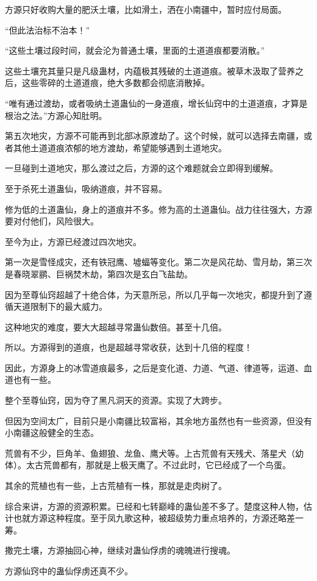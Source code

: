 \begin{this_body}
方源只好收购大量的肥沃土壤，比如滑土，洒在小南疆中，暂时应付局面。

“但此法治标不治本！”

“这些土壤过段时间，就会沦为普通土壤，里面的土道道痕都要消散。”

这些土壤充其量只是凡级蛊材，内蕴极其残破的土道道痕。被草木汲取了营养之后，这些零碎的土道道痕，绝大多数都会彻底消散掉。

“唯有通过渡劫，或者吸纳土道蛊仙的一身道痕，增长仙窍中的土道道痕，才算是根治之法。”方源心知肚明。

第五次地灾，方源不可能再到北部冰原渡劫了。这个时候，就可以选择去南疆，或者其他土道道痕浓郁的地方渡劫，希望能够遇到土道地灾。

一旦碰到土道地灾，那么渡过之后，方源的这个难题就会立即得到缓解。

至于杀死土道蛊仙，吸纳道痕，并不容易。

修为低的土道蛊仙，身上的道痕并不多。修为高的土道蛊仙。战力往往强大，方源要对付他们，风险很大。

至今为止，方源已经渡过四次地灾。

第一次是雪怪成灾，还有铁冠鹰、墟蝠等变化。第二次是风花劫、雪月劫，第三次是春晓翠鹂、巨祸焚木劫，第四次是玄白飞盐劫。

因为至尊仙窍超越了十绝合体，为天意所忌，所以几乎每一次地灾，都提升到了遵循天道限制下的最大威力。

这种地灾的难度，要大大超越寻常蛊仙数倍。甚至十几倍。

所以。方源得到的道痕，也是超越寻常收获，达到十几倍的程度！

因此，方源身上的冰雪道痕最多，之后是变化道、力道、气道、律道等，运道、血道也有一些。

整个至尊仙窍，因为夺了黑凡洞天的资源。实现了大跨步。

但因为空间太广，目前只是小南疆比较富裕，其余地方虽然也有一些资源，但没有小南疆这般健全的生态。

荒兽有不少，巨角羊、鱼翅狼、龙鱼、鹰犬等。上古荒兽有天残犬、落星犬（幼体）。太古荒兽都有，那就是上极天鹰了。不过此时，它已经成了一个鸟蛋。

其余的荒植也有一些，上古荒植有一株，那就是走肉树了。

综合来讲，方源的资源积累。已经和七转巅峰的蛊仙差不多了。楚度这种人物，估计也就方源这种程度。至于凤九歌这种，被超级势力重点培养的，方源还略差一筹。

撒完土壤，方源抽回心神，继续对蛊仙俘虏的魂魄进行搜魂。

方源仙窍中的蛊仙俘虏还真不少。


\end{this_body}
